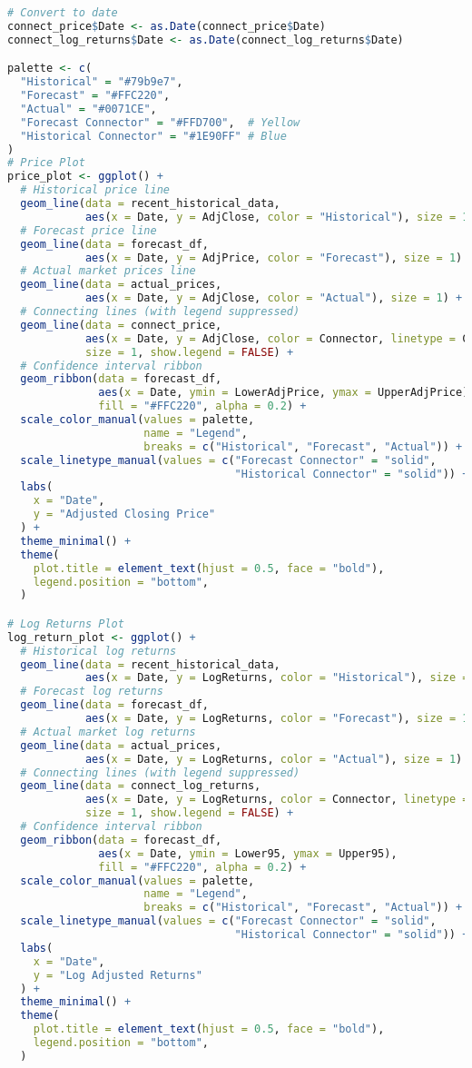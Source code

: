 \documentclass{article}
\newcommand{\1}{\mathbbm{1}}
\theoremstyle{definition}
\begin{document}
\begin{lstlisting}[language=R]
# Convert to date
connect_price$Date <- as.Date(connect_price$Date)
connect_log_returns$Date <- as.Date(connect_log_returns$Date)

palette <- c(
  "Historical" = "#79b9e7",
  "Forecast" = "#FFC220",
  "Actual" = "#0071CE",
  "Forecast Connector" = "#FFD700",  # Yellow
  "Historical Connector" = "#1E90FF" # Blue
)
# Price Plot
price_plot <- ggplot() +
  # Historical price line
  geom_line(data = recent_historical_data, 
            aes(x = Date, y = AdjClose, color = "Historical"), size = 1) +
  # Forecast price line
  geom_line(data = forecast_df, 
            aes(x = Date, y = AdjPrice, color = "Forecast"), size = 1) +
  # Actual market prices line
  geom_line(data = actual_prices, 
            aes(x = Date, y = AdjClose, color = "Actual"), size = 1) +
  # Connecting lines (with legend suppressed)
  geom_line(data = connect_price, 
            aes(x = Date, y = AdjClose, color = Connector, linetype = Connector), 
            size = 1, show.legend = FALSE) +
  # Confidence interval ribbon
  geom_ribbon(data = forecast_df, 
              aes(x = Date, ymin = LowerAdjPrice, ymax = UpperAdjPrice), 
              fill = "#FFC220", alpha = 0.2) +
  scale_color_manual(values = palette,
                     name = "Legend",
                     breaks = c("Historical", "Forecast", "Actual")) +
  scale_linetype_manual(values = c("Forecast Connector" = "solid", 
                                   "Historical Connector" = "solid")) +
  labs(
    x = "Date",
    y = "Adjusted Closing Price"
  ) +
  theme_minimal() +
  theme(
    plot.title = element_text(hjust = 0.5, face = "bold"),
    legend.position = "bottom",
  )

# Log Returns Plot
log_return_plot <- ggplot() +
  # Historical log returns
  geom_line(data = recent_historical_data, 
            aes(x = Date, y = LogReturns, color = "Historical"), size = 1) +
  # Forecast log returns
  geom_line(data = forecast_df, 
            aes(x = Date, y = LogReturns, color = "Forecast"), size = 1) +
  # Actual market log returns
  geom_line(data = actual_prices, 
            aes(x = Date, y = LogReturns, color = "Actual"), size = 1) +
  # Connecting lines (with legend suppressed)
  geom_line(data = connect_log_returns, 
            aes(x = Date, y = LogReturns, color = Connector, linetype = Connector), 
            size = 1, show.legend = FALSE) +
  # Confidence interval ribbon
  geom_ribbon(data = forecast_df, 
              aes(x = Date, ymin = Lower95, ymax = Upper95), 
              fill = "#FFC220", alpha = 0.2) +
  scale_color_manual(values = palette,
                     name = "Legend",
                     breaks = c("Historical", "Forecast", "Actual")) +
  scale_linetype_manual(values = c("Forecast Connector" = "solid", 
                                   "Historical Connector" = "solid")) +
  labs(
    x = "Date",
    y = "Log Adjusted Returns"
  ) +
  theme_minimal() +
  theme(
    plot.title = element_text(hjust = 0.5, face = "bold"),
    legend.position = "bottom",
  )


\end{lstlisting}
\end{document}
